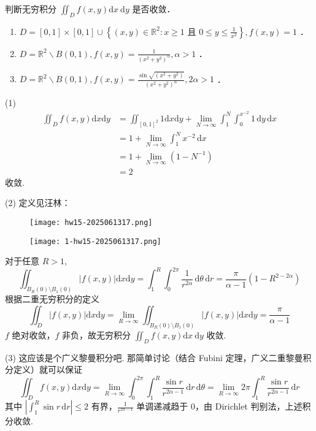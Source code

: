 \begin{exercise}
判断无穷积分 $\iint_D f(x, y) \mathrm{d} x \mathrm{~d} y$ 是否收敛．
	\begin{enumerate}
		\item $D=[0,1] \times[0,1] \cup\left\{(x, y) \in \mathbb{R}^2: x \geq 1\right.$ 且 $\left.0 \leq y \leq \frac{1}{x^2}\right\}, f(x, y)=1$ ．
		\item $D=\mathbb{R}^2 \backslash B(0,1), f(x, y)=\frac{1}{\left(x^2+y^2\right)^\alpha}, \alpha>1$ ．
		\item $D=\mathbb{R}^2 \backslash B(0,1), f(x, y)=\frac{\sin \sqrt{\left(x^2+y^2\right)}}{\left(x^2+y^2\right)^\alpha}, 2 \alpha>1$ ．
	\end{enumerate}
\end{exercise}
(1)
\[
\begin{aligned}
\iint_{D}f(x,y)\mathrm{d}x\mathrm{d}y & =\iint_{[0,1]^{2}} 1 \mathrm{d}x\mathrm{d}y+\lim_{ N \to \infty } \int_{1}^{N} \int_{0}^{x^{-2}} 1 \, \mathrm{d}y  \, \mathrm{d}x  \\
 & =1+\lim_{ N \to \infty } \int_{1}^{N} x^{-2} \, \mathrm{d}x  \\
 & =1+\lim_{ N \to \infty }(1-N^{-1}) \\
 & =2
\end{aligned}
\]
收敛.

(2) 定义见汪林：
\begin{figure}[H]
\centering
\texttt{[image: hw15-2025061317.png]}
\label{}
\end{figure}
\begin{figure}[H]
\centering
\texttt{[image: 1-hw15-2025061317.png]}
\label{}
\end{figure}

对于任意 $R>1$,
\[
\iint_{B_{R}(0)\setminus B_1(0)}\lvert f(x,y) \rvert \mathrm{d}x\mathrm{d}y=\int_{1}^{R} \int_{0}^{2\pi} \frac{1}{r^{2\alpha}} \, \mathrm{d}\theta  \, \mathrm{d}r=\frac{\pi}{\alpha-1}(1-R^{2-2\alpha})  
\]
根据二重无穷积分的定义
\[
\iint_{D}\lvert f(x,y) \rvert \mathrm{d}x\mathrm{d}y=\lim_{ R \to \infty } \iint_{B_{R}(0)\setminus B_1(0)}\lvert f(x,y) \rvert \mathrm{d}x\mathrm{d}y=\frac{\pi}{\alpha-1}
\]
$f$ 绝对收敛，$f$ 非负，故无穷积分 $\iint_D f(x, y) \mathrm{d} x \mathrm{~d} y$ 收敛.

(3)
这应该是个广义黎曼积分吧. 那简单讨论（结合 Fubini 定理，广义二重黎曼积分定义）就可以保证
\[
\iint_{D}f(x,y)\mathrm{d}x\mathrm{d}y=\lim_{ R \to \infty } \int_{0}^{2\pi} \int_{1}^{R} \frac{\sin r}{r^{2\alpha-1}} \, \mathrm{d}r  \, \mathrm{d}\theta=\lim_{ R \to \infty } 2\pi \int_{1}^{R} \frac{\sin r}{r^{2\alpha-1}} \, \mathrm{d}r
\]
其中 $\left\lvert  \int_{1}^{R} \sin r \, \mathrm{d}r  \right\rvert\leq2$ 有界，$\frac{1}{r^{2\alpha-1}}$ 单调递减趋于 0，由 Dirichlet 判别法，上述积分收敛.

